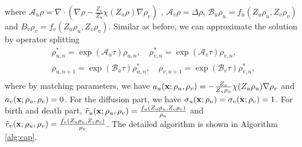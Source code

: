 \documentclass[12pt]{article}
\begin{document}
where $\mathcal A_u \rho = \nabla \cdot ( \nabla \rho - \frac{Z_v}{Z_u} \chi(Z_u\rho) \nabla \rho_v)$ , $\mathcal A_v \rho = \Delta \rho$, $\mathcal B_u \rho_u  = f_u(Z_u\rho_u,Z_v \rho_v)$ and $B_v \rho_v = f_v(Z_u\rho_u,Z_v \rho_v)$. Similar as before, we can approximate the solution by operator splitting 
\begin{equation}
    \begin{aligned}
        \rho_{u,n}^*  =  \exp(\mathcal A_u\tau) \rho_{u,n}, \quad 
         \rho_{v,n}^*  =  \exp(\mathcal A_v\tau) \rho_{v,n},  \\
         \rho_{u,n+1} =  \exp(\mathcal B_u\tau) \rho_{u,n}^*,  \quad 
         \rho_{v,n+1}  =  \exp(\mathcal B_v\tau) \rho_{v,n}^*,   \\
    \end{aligned}
\end{equation}
where by matching parameters, we have $a_u(\mathbf{x};\rho_u,\rho_v) =  - \frac{Z_v}{Z_u\rho_u} \chi(Z_u\rho_u) \nabla \rho_v $ and $a_v(\mathbf{x};\rho_u,\rho_v)= 0$. For the diffusion part, we have $\sigma_u(\mathbf{x};\rho_u) = \sigma_v(\mathbf{x};\rho_v) = 1$. For birth and death part, $\tilde r_u (\mathbf{x};\rho_u,\rho_v)=  \frac{f_u(Z_u\rho_u,Z_v \rho_v)}{\rho_u}  $ and $\tilde r_v (\mathbf{x};\rho_u,\rho_v )=  \frac{f_v(Z_u\rho_u,Z_v \rho_v)}{\rho_v}  $. The detailed algorithm is shown in  Algorithm \ref{alg:cap}.
\end{document}

